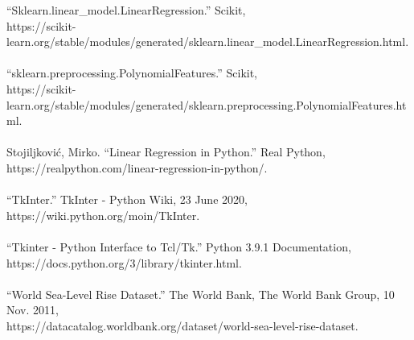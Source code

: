 \documentclass[fontsize=11pt]{article}
\begin{document}
“Sklearn.linear\_model.LinearRegression.” Scikit, \\ https://scikit-learn.org/stable/modules/generated/sklearn.linear\_model.LinearRegression.html.\\\\
“sklearn.preprocessing.PolynomialFeatures.” Scikit, \\ https://scikit-learn.org/stable/modules/generated/sklearn.preprocessing.PolynomialFeatures.html.\\\\
Stojiljković, Mirko. “Linear Regression in Python.” Real Python, https://realpython.com/linear-regression-in-python/.\\\\
“TkInter.” TkInter - Python Wiki, 23 June 2020, https://wiki.python.org/moin/TkInter.\\\\
“Tkinter - Python Interface to Tcl/Tk.” Python 3.9.1 Documentation, https://docs.python.org/3/library/tkinter.html.\\\\
“World Sea-Level Rise Dataset.” The World Bank, The World Bank Group, 10 Nov. 2011, \\ https://datacatalog.worldbank.org/dataset/world-sea-level-rise-dataset.
\end{document}
